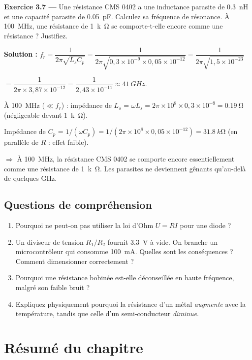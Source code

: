 \documentclass[12pt,a4paper,twoside]{book}
\begin{document}
\textbf{Exercice 3.7 —} Une résistance CMS 0402 a une inductance parasite de \SI{0.3}{nH} et une capacité parasite de \SI{0.05}{pF}. Calculez sa fréquence de résonance. À \SI{100}{MHz}, une résistance de \SI{1}{k\ohm} se comporte-t-elle encore comme une résistance ? Justifiez.

\begin{pratique}
\textbf{Solution :} $f_r = \dfrac{1}{2\pi\sqrt{L_s C_p}} = \dfrac{1}{2\pi\sqrt{0{,}3\times10^{-9} \times 0{,}05\times10^{-12}}} = \dfrac{1}{2\pi\sqrt{1{,}5\times10^{-23}}}$

$= \dfrac{1}{2\pi \times 3{,}87\times10^{-12}} = \dfrac{1}{2{,}43\times10^{-11}} \approx \SI{41}{GHz}$.

À \SI{100}{MHz} ($\ll f_r$) : impédance de $L_s$ = $\omega L_s = 2\pi \times 10^8 \times 0{,}3\times10^{-9} = \SI{0.19}{\ohm}$ (négligeable devant \SI{1}{k\ohm}).

Impédance de $C_p$ = $1/(\omega C_p) = 1/(2\pi \times 10^8 \times 0{,}05\times10^{-12}) = \SI{31.8}{k\ohm}$ (en parallèle de $R$ : effet faible).

$\Rightarrow$ À \SI{100}{MHz}, la résistance CMS 0402 se comporte encore essentiellement comme une résistance de \SI{1}{k\ohm}. Les parasites ne deviennent gênants qu'au-delà de quelques GHz.
\end{pratique}

\subsection*{Questions de compréhension}

\begin{enumerate}[nosep]
\item Pourquoi ne peut-on pas utiliser la loi d'Ohm $U = RI$ pour une diode ?
\item Un diviseur de tension $R_1/R_2$ fournit \SI{3.3}{V} à vide. On branche un microcontrôleur qui consomme \SI{100}{mA}. Quelles sont les conséquences ? Comment dimensionner correctement ?
\item Pourquoi une résistance bobinée est-elle déconseillée en haute fréquence, malgré son faible bruit ?
\item Expliquez physiquement pourquoi la résistance d'un métal \textit{augmente} avec la température, tandis que celle d'un semi-conducteur \textit{diminue}.
\end{enumerate}

\section*{Résumé du chapitre}
\end{document}
